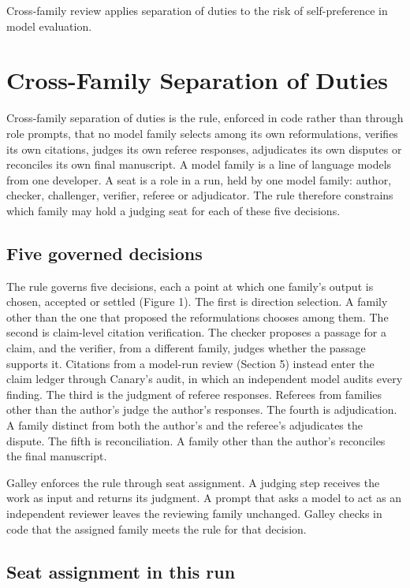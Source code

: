 \documentclass[
]{article}
\begin{document}
Cross-family review applies separation of duties to the risk of
self-preference in model evaluation.

\section{Cross-Family Separation of
Duties}\label{cross-family-separation-of-duties}

Cross-family separation of duties is the rule, enforced in code rather
than through role prompts, that no model family selects among its own
reformulations, verifies its own citations, judges its own referee
responses, adjudicates its own disputes or reconciles its own final
manuscript. A model family is a line of language models from one
developer. A seat is a role in a run, held by one model family: author,
checker, challenger, verifier, referee or adjudicator. The rule
therefore constrains which family may hold a judging seat for each of
these five decisions.

\subsection{Five governed decisions}\label{five-governed-decisions}

The rule governs five decisions, each a point at which one family's
output is chosen, accepted or settled (Figure 1). The first is direction
selection. A family other than the one that proposed the reformulations
chooses among them. The second is claim-level citation verification. The
checker proposes a passage for a claim, and the verifier, from a
different family, judges whether the passage supports it. Citations from
a model-run review (Section 5) instead enter the claim ledger through
Canary's audit, in which an independent model audits every finding. The
third is the judgment of referee responses. Referees from families other
than the author's judge the author's responses. The fourth is
adjudication. A family distinct from both the author's and the referee's
adjudicates the dispute. The fifth is reconciliation. A family other
than the author's reconciles the final manuscript.

Galley enforces the rule through seat assignment. A judging step
receives the work as input and returns its judgment. A prompt that asks
a model to act as an independent reviewer leaves the reviewing family
unchanged. Galley checks in code that the assigned family meets the rule
for that decision.

\subsection{Seat assignment in this
run}\label{seat-assignment-in-this-run}
\end{document}
